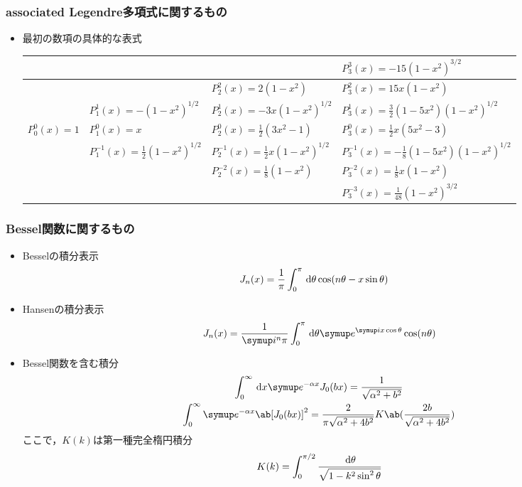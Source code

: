 \subsubsection{associated Legendre多項式に関するもの}
\begin{itemize}%
  \item 最初の数項の具体的な表式
    \begin{table}[H]%
      \centering%
      \begin{tabular}{|l|l|l|l|}  
        \hline
        & & & $P_3^3(x) = -15(1-x^2)^{3/2}$\\\hline
        & & $P_2^2(x) = 2(1-x^2)$& $P_3^2(x) = 15x(1-x^2)$\\\hline
        & $P_1^1(x) = -(1-x^2)^{1/2}$& $P_2^1(x) = -3x(1-x^2)^{1/2}$& $P_3^1(x) = \frac{3}{2}(1-5x^2)(1-x^2)^{1/2}$\\\hline
        $P_0^0(x) = 1$& $P_1^0(x) = x$& $P_2^0(x) = \frac{1}{2}(3x^2-1)$& $P_3^0(x) = \frac{1}{2}x(5x^2 - 3)$\\\hline
        & $P_1^{-1}(x) = \frac{1}{2}(1-x^2)^{1/2}$& $P_2^{-1}(x) = \frac{1}{2} x(1-x^2)^{1/2}$& $P_3^{-1}(x) = -\frac{1}{8} (1-5x^2)(1-x^2)^{1/2}$\\\hline
        & & $P_2^{-2}(x) = \frac{1}{8}(1-x^2)$& $P_3^{-2} (x) = \frac{1}{8} x (1-x^2)$\\\hline
        & & & $P_3^{-3} (x) = \frac{1}{48}(1-x^2)^{3/2}$\\\hline
      \end{tabular}%
    \end{table}%
\end{itemize}%

\subsubsection{Bessel関数に関するもの}
\begin{itemize}%
  \item Besselの積分表示
    \begin{align}
      J_n(x) &= \frac{1}{\pi} \int_0^\pi \dl{\theta \cos(n\theta - x \sin\theta)}
    \end{align}%
  \item Hansenの積分表示
    \begin{gather}%
      J_n(x) = \frac{1}{\i^n \pi} \int_0^\pi \dl{\theta} \e^{\i x\cos\theta} \cos(n\theta)
    \end{gather}%
  \item Bessel関数を含む積分
    \begin{gather}%
      \label{eq:6.611.1}
      \int_0^\infty \dl{x} \e^{-\alpha x} J_0(bx) = \frac{1}{\sqrt{\alpha^2 + b^2}}\\
      \label{eq:6.612.4}
      \int_0^\infty \e^{-\alpha x} \ab[J_0(bx)]^2 =
      \frac{2}{\pi\sqrt{\alpha^2 + 4b^2}} K\ab(\frac{2b}{\sqrt{\alpha^2 + 4b^2}}) 
    \end{gather}%
    ここで，$K(k)$は第一種完全楕円積分
    \begin{gather}%
      K(k) = \int_0^{\pi/2} \frac{\dl{\theta}}{\sqrt{1-k^2\sin^2\theta}}
    \end{gather}%
\end{itemize}%

